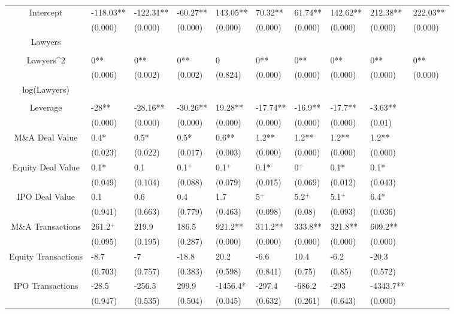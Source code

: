\documentclass{article}
\begin{document}
\begin{table}[H]
\begin{tabular}{|clllllllll|}
Intercept & -118.03** & -122.31** & -60.27** & 143.05** & 70.32** & 61.74** & 142.62** & 212.38** & 222.03** \\ 
   & (0.000) & (0.000) & (0.000) & (0.000) & (0.000) & (0.000) & (0.000) & (0.000) & (0.000) \\ 
  Lawyers &  &  &  &  &  &  &  &  &  \\ 
   &  &  &  &  &  &  &  &  &  \\ 
  Lawyers^2 & 0** & 0** & 0** & 0 & 0** & 0** & 0** & 0** & 0** \\ 
   & (0.006) & (0.002) & (0.002) & (0.824) & (0.000) & (0.000) & (0.000) & (0.000) & (0.000) \\ 
  log(Lawyers) &  &  &  &  &  &  &  &  &  \\ 
   &  &  &  &  &  &  &  &  &  \\ 
  Leverage & -28** & -28.16** & -30.26** & 19.28** & -17.74** & -16.9** & -17.7** & -3.63** &  \\ 
   & (0.000) & (0.000) & (0.000) & (0.000) & (0.000) & (0.000) & (0.000) & (0.01) &  \\ 
  M\&A Deal Value & 0.4* & 0.5* & 0.5* & 0.6** & 1.2** & 1.2** & 1.2** & 1.2** &  \\ 
   & (0.023) & (0.022) & (0.017) & (0.003) & (0.000) & (0.000) & (0.000) & (0.000) &  \\ 
  Equity Deal Value & 0.1* & 0.1 & 0.1$^{+}$ & 0.1$^{+}$ & 0.1* & 0$^{+}$ & 0.1* & 0.1* &  \\ 
   & (0.049) & (0.104) & (0.088) & (0.079) & (0.015) & (0.069) & (0.012) & (0.043) &  \\ 
  IPO Deal Value & 0.1 & 0.6 & 0.4 & 1.7 & 5$^{+}$ & 5.2$^{+}$ & 5.1$^{+}$ & 6.4* &  \\ 
   & (0.941) & (0.663) & (0.779) & (0.463) & (0.098) & (0.08) & (0.093) & (0.036) &  \\ 
  M\&A Transactions & 261.2$^{+}$ & 219.9 & 186.5 & 921.2** & 311.2** & 333.8** & 321.8** & 609.2** &  \\ 
   & (0.095) & (0.195) & (0.287) & (0.000) & (0.000) & (0.000) & (0.000) & (0.000) &  \\ 
  Equity Transactions & -8.7 & -7 & -18.8 & 20.2 & -6.6 & 10.4 & -6.2 & -20.3 &  \\ 
   & (0.703) & (0.757) & (0.383) & (0.598) & (0.841) & (0.75) & (0.85) & (0.572) &  \\ 
  IPO Transactions & -28.5 & -256.5 & 299.9 & -1456.4* & -297.4 & -686.2 & -293 & -4343.7** &  \\ 
   & (0.947) & (0.535) & (0.504) & (0.045) & (0.632) & (0.261) & (0.643) & (0.000) &  \\ 

\end{tabular}
\end{table}
\end{document}
